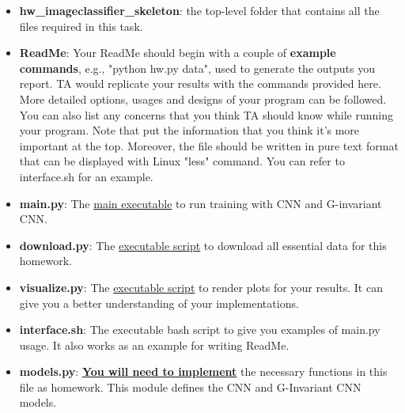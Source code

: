 \begin{itemize}
\item \textbf{hw\homeworknumber\_imageclassifier\_skeleton}: the top-level folder that contains all the files
          required in this task.


\item \textbf{ReadMe}: Your ReadMe should begin with a couple of \textbf{example commands}, e.g., "python hw\homeworknumber.py data", used to generate the outputs you report. TA would replicate your results with the commands
          provided here. More detailed options, usages and designs of your
          program can be followed. You can also list any concerns that you
          think TA should know while running your program. Note that put the
          information that you think it's more important at the top. Moreover,
          the file should be written in pure text format that can be displayed
          with Linux "less" command.
          You can refer to interface.sh for an example.

\item \textbf{main.py}: The \underline{main executable} to run training with CNN and G-invariant CNN.
\item \textbf{download.py}: The \underline{executable script} to download all essential data for this homework.
\item \textbf{visualize.py}: The \underline{executable script} to render plots for your results.
          It can give you a better understanding of your implementations.

\item \textbf{interface.sh}: The executable bash script to give you examples of main.py usage. It also works as an example for writing ReadMe.


\item \textbf{models.py}: \underline{\bf You will need to implement} the necessary functions in this file as homework. This module defines the CNN and G-Invariant CNN models. 


\end{itemize}
